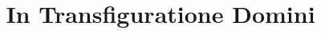 \documentclass[17pt]{extarticle}
\begin{document}
\title{In Transfiguratione Domini}
\makereadingtitle

\end{document}
